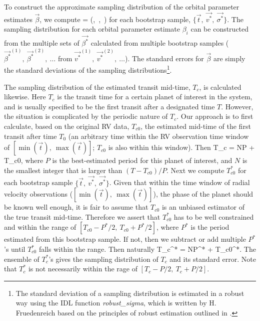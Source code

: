 To construct the approximate sampling distribution of the orbital
parameter estimates $\vec{\beta}$, we compute \beq \vec{\beta^*} =
\mu(,\ ,\ \vec{\sigma^*}) \eeq for each bootstrap
sample, $\lbrace \vec{t},\ \vec{v^*},\ \vec{\sigma^*} \rbrace$. The
sampling distribution for each orbital parameter estimate $\beta_i$
can be constructed from the multiple sets of $\vec{\beta^*}$
calculated from multiple bootstrap samples
($\vec{\beta^*}^{(1)},\ \vec{\beta^*}^{(2)},\ \ldots$ from
$\vec{v^*}^{(1)},\ \vec{v^*}^{(2)},\ \ldots$). The standard errors for
$\vec{\beta}$ are simply the standard deviations of the sampling
distributions\footnote{The standard deviation of a sampling
  distribution is estimated in a robust way using the IDL function
  {\it robust\_sigma}, which is written by H. Fruedenreich based on
  the principles of robust estimation outlined in \cite{1983ured.book.....H}.}.

The sampling distribution of the estimated transit mid-time, $T_c$, is
calculated likewise. Here $T_c$ is the transit time for a certain
planet of interest in the system, and is usually specified to be the first
transit after a designated time $T$.  However, the situation is
complicated by the periodic nature of $T_c$. Our approach is to first
calculate, based on the original RV data, $T_{c0}$, the estimated
mid-time of the first transit after time $T_0$ (an arbitrary time
within the RV observation time window of $[\min(\vec{t}),\ \max(\vec{t})]$; $T_{c0}$ 
is also within this window).
Then
\beq
T_c = N\cdot P + T_{c0},
\eeq
where $P$ is the best-estimated period for this planet of interest,
and $N$ is the smallest integer that is larger than $(T - T_{c0})/P$.
Next we compute $T_{c0}^*$ for each bootstrap sample $\lbrace
\vec{t},\ \vec{v^*},\ \vec{\sigma^*} \rbrace$. Given that within the
time window of radial velocity observations
($[\min(\vec{t}),\ \max(\vec{t})]$), the phase of the planet should be
known well enough, it is fair to assume that $T_{c0}$ is an unbiased
estimator of the true transit mid-time. Therefore we assert that
$T_{c0}^*$ has to be well constrained and within the range of
$[T_{c0}-P^*/2,\ T_{c0}+P^*/2]$, where $P^*$ is the period estimated from
this bootstrap sample. If not, then we subtract or add multiple
$P^*$'s until $T_{c0}^*$ falls within the range. Then naturally
\beq
T_c^* = N\cdot P^* + T_{c0}^*.
\eeq
The ensemble of $T_c^*$'s gives the sampling distribution of $T_c$
and its standard error. Note that $T_c^*$ is not necessarily within
the rage of $[T_{c}-P/2,\ T_{c}+P/2]$.

